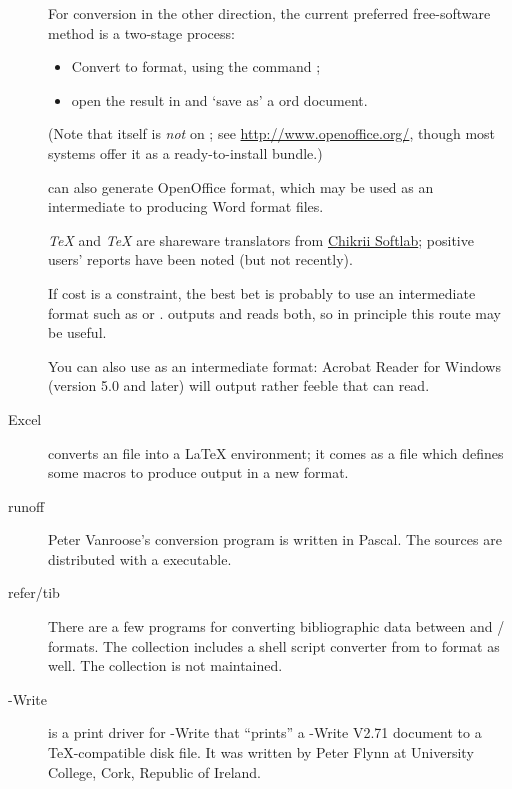 \begin{description}
  For conversion in the other direction, the current preferred
  free-software method is a two-stage process:
  \begin{itemize}
  \item Convert \latex{} to  format, using the
     command ;
  \item open the result in  and `save as' a
    ord document.
  \end{itemize}
  (Note that  itself is \emph{not} on
  ; see \url{http://www.openoffice.org/}, though most
   systems offer it as a ready-to-install bundle.)

   can also generate OpenOffice 
  format, which may be used as an intermediate to producing Word
  format files.

  \emph{\TeX{}} and \emph{\TeX{}} are 
  shareware translators from %
  \href{http://www.chikrii.com/}{Chikrii Softlab}; positive users'
  reports have been noted (but not recently).

  If cost is a constraint, the best bet is probably to use an
  intermediate format such as  or .
   outputs and reads both, so in principle this route
  may be useful.

  You can also use  as an intermediate format: Acrobat Reader
  for Windows (version 5.0 and later) will output rather feeble
   that  can read.
\item[Excel]  converts an  file
  into a \LaTeX{}  environment; it comes as a
   file which defines some  macros to produce
  output in a new format.
\item[runoff] Peter Vanroose's 
  conversion program is written in  Pascal.
  The sources are distributed with a  executable.
\item[refer/tib] There are a few programs for converting bibliographic
  data between \BibTeX{} and / formats.
  The collection includes a shell script converter from \BibTeX{} to
   format as well. The collection
  is not maintained.
\item[\acro{PC}-Write] is a
  print driver for -Write that ``prints'' a -Write
  V2.71 document to a \TeX{}-compatible disk file.  It was written by Peter
  Flynn at University College, Cork, Republic of Ireland.
\end{description}

